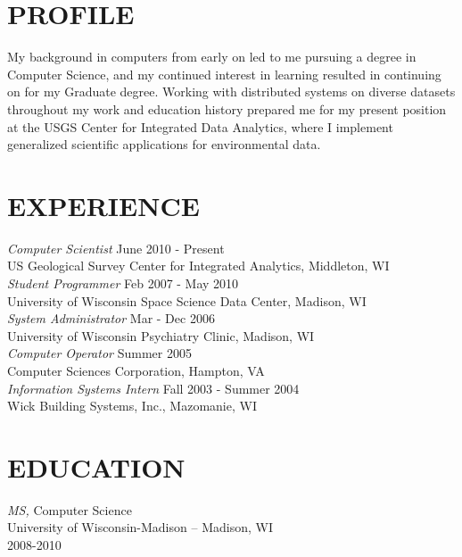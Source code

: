 \documentclass[line,margin]{res}
\begin{document}
\address{1010 Gammon Ln Apt 1, Madison, WI 53719}
\address{email: jiwalker@usgs.gov | phone: 608.370.1908}
 
\begin{resume}
 
\section{PROFILE} My background in computers from early on led to me pursuing a degree in Computer Science, and my continued interest in learning resulted in continuing on for my Graduate degree.  Working with distributed systems on diverse datasets throughout my work and education history prepared me for my present position at the USGS Center for Integrated Data Analytics, where I implement generalized scientific applications for environmental data.
 
\section{EXPERIENCE} 	{\sl Computer Scientist} \hfill June 2010 - Present \\
                US Geological Survey Center for Integrated Analytics, Middleton, WI \\
		{\sl Student Programmer} \hfill Feb 2007 - May 2010 \\
                University of Wisconsin Space Science Data Center, Madison, WI\\
		{\sl System Administrator} \hfill Mar - Dec 2006 \\
	     University of Wisconsin Psychiatry Clinic, Madison, WI \\
		{\sl Computer Operator} \hfill Summer 2005 \\
                Computer Sciences Corporation, Hampton, VA \\
		{\sl Information Systems Intern} \hfill Fall 2003 - Summer 2004 \\
                Wick Building Systems, Inc., Mazomanie, WI
 
\section{EDUCATION} {\sl MS,} Computer Science \\
        	     	University of Wisconsin-Madison -- Madison, WI \\ 
                	2008-2010


\end{resume}
\end{document}
